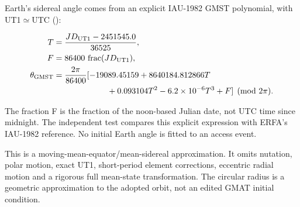 \documentclass[10pt,a4paper]{article}
\numberwithin{equation}{section}
\begin{document}
\begin{sloppypar}Earth's sidereal angle comes from an explicit IAU-1982 GMST polynomial, with UT1\ensuremath{\simeq}UTC (\cite{S17}):\end{sloppypar}


\begin{equation}\begin{aligned}
T&=\frac{JD_{\rm UT1}-2451545.0}{36525},\\
F&=86400\,\operatorname{frac}(JD_{\rm UT1}),\\
\theta_{\rm GMST}
&=\frac{2\pi}{86400}
[-19089.45159+8640184.812866T\\
&\hspace{23mm}+0.093104T^2-6.2\times10^{-6}T^3+F]
\pmod{2\pi}.
\end{aligned}\label{eq:ch5-15}\end{equation}

\begin{sloppypar}The fraction F is the fraction of the noon-based Julian date, not UTC time since midnight. The independent test compares this explicit expression with ERFA's IAU-1982 reference. No initial Earth angle is fitted to an access event.\end{sloppypar}


\begin{sloppypar}This is a moving-mean-equator/mean-sidereal approximation. It omits nutation, polar motion, exact UT1, short-period element corrections, eccentric radial motion and a rigorous full mean-state transformation. The circular radius is a geometric approximation to the adopted orbit, not an edited GMAT initial condition.\end{sloppypar}
\end{document}
